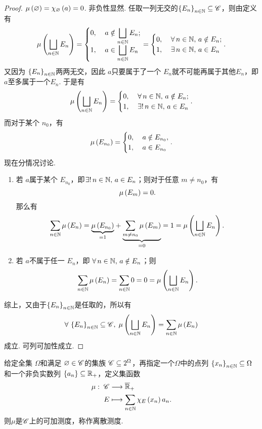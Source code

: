 \begin{proof}
    $\mu\left(\varnothing\right)=\chi_\varnothing\left(a\right)=0$. 非负性显然. 任取一列无交的$\left\{ E_n \right\}_{n\in\mathbb{N}}\subseteq\mathscr{C}$，则由定义有
    \[   \mu\left( \bigsqcup_{n\in\mathbb{N}} E_n \right)=\begin{cases}
        0,\; &a\notin \displaystyle\bigsqcup_{n\in\mathbb{N}} E_n ; \\
        1,\; &a\in \displaystyle\bigsqcup_{n\in\mathbb{N}} E_n 
    \end{cases} =  \begin{cases}
        0,\; &\forall\,n\in\mathbb{N},\,a\notin E_n ; \\
        1,\; &\exists\,n\in\mathbb{N},\,a\in E_n 
    \end{cases}.  \]
    又因为 $\left\{ E_n \right\}_{n\in\mathbb{N}}$两两无交，因此 $a$只要属于了一个 $E_n$就不可能再属于其他$E_n$，即$a$至多属于一个$E_n$. 于是有
    \[   \mu\left( \bigsqcup_{n\in\mathbb{N}} E_n \right)=\begin{cases}
        0,\; &\forall\,n\in\mathbb{N},\,a\notin E_n ; \\
        1,\; &\exists!\,n\in\mathbb{N},\,a\in E_n 
    \end{cases}.   \]
    而对于某个 $n_0$，有
    \[  \mu\left(E_{n_0}\right)=\begin{cases}
        0, \; &a\notin E_{n_0}, \\
        1, \; &a\in E_{n_0}
    \end{cases}.  \]
    现在分情况讨论.
    \begin{enumerate}
        \item 若 $a$属于某个 $E_{n_0}$，即$\exists!\,n\in\mathbb{N},\,a\in E_n$；则对于任意 $m\ne n_0$，有
        \[ \mu\left(E_m\right)=0. \]
        那么有
        \[ \sum_{n\in\mathbb{N}}\mu\left(E_n\right)= \underset{=1}{\underbrace{\mu\left(E_{n_0}\right)}} + \underset{=0}{\underbrace{\sum_{m\neq n_0} \mu\left(E_m\right)}}=1=\mu\left( \bigsqcup_{n\in\mathbb{N}} E_n \right).\]
        \item 若 $a$不属于任一 $E_n$，即 $\forall\,n\in\mathbb{N},\,a\notin E_n$；则
        \[   \sum_{n\in\mathbb{N}}\mu\left(E_n\right)= \sum_{n\in\mathbb{N}} 0 =0= \mu\left( \bigsqcup_{n\in\mathbb{N}} E_n \right). \]
    \end{enumerate}
    综上，又由于$\left\{ E_n \right\}_{n\in\mathbb{N}}$是任取的，所以有
    \[ \forall\,\left\{ E_n \right\}_{n\in\mathbb{N}}\subseteq\mathscr{C},\;\mu\left( \bigsqcup_{n\in\mathbb{N}} E_n \right) = \sum_{n\in\mathbb{N}} \mu\left(E_n\right) \]
    成立. 可列可加性成立.
\end{proof}
\begin{example}
    给定全集 $\Omega$和满足 $\varnothing\in\mathscr{C}$的集族 $\mathscr{C}\subseteq2^{\Omega}$，再指定一个$\Omega$中的点列 $\left\{ x_n \right\}_{n\in\mathbb{N}}\subseteq\Omega$和一个非负实数列 $\left\{ a_n \right\}\subseteq\mathbb{R}_+$，定义集函数
        \begin{align*}
            \mu:\; \mathscr{C} &\longrightarrow \overline{\mathbb{R}}_+ \\
            E &\longmapsto \sum_{n\in\mathbb{N}} \chi_{E}\left(x_n\right) a_n.
        \end{align*}
    则$\mu$是$\mathscr{C}$上的可加测度，称作离散测度.
\end{example}
